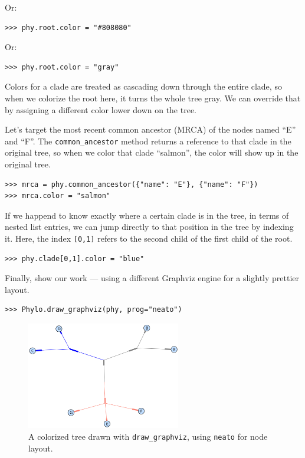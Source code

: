 \documentclass{report}
\begin{document}
Or:

\begin{verbatim}
>>> phy.root.color = "#808080"
\end{verbatim}

Or:

\begin{verbatim}
>>> phy.root.color = "gray"
\end{verbatim}

Colors for a clade are treated as cascading down through the entire clade, so when we colorize
the root here, it turns the whole tree gray.  We can override that by assigning a different
color lower down on the tree.

Let's target the most recent common ancestor (MRCA) of the nodes named ``E'' and ``F''.  The
\verb|common_ancestor| method returns a reference to that clade in the original tree, so when
we color that clade ``salmon'', the color will show up in the original tree.

\begin{verbatim}
>>> mrca = phy.common_ancestor({"name": "E"}, {"name": "F"})
>>> mrca.color = "salmon"
\end{verbatim}

If we happend to know exactly where a certain clade is in the tree, in terms of nested list
entries, we can jump directly to that position in the tree by indexing it.  Here, the index
\verb|[0,1]| refers to the second child of the first child of the root.

\begin{verbatim}
>>> phy.clade[0,1].color = "blue"
\end{verbatim}

Finally, show our work --- using a different Graphviz engine for a slightly prettier layout.

\begin{verbatim}
>>> Phylo.draw_graphviz(phy, prog="neato")
\end{verbatim}


\begin{htmlonly}
\label{fig:phylo-color}
\end{htmlonly}

\begin{latexonly}
\begin{figure}[htb]
\centering
\includegraphics[width=0.6\textwidth]{images/phylo-color.png}
\caption{A colorized tree drawn with {\tt draw\_graphviz}, using {\tt neato} for node layout.}
\label{fig:phylo-color}
\end{figure}
\end{latexonly}
\end{document}
